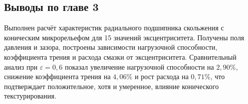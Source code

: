 \subsection*{Выводы по главе 3}
{}

Выполнен расчёт характеристик радиального подшипника скольжения с коническим микрорельефом для 15 значений эксцентриситета. Получены поля давления и зазора, построены зависимости нагрузочной способности, коэффициента трения и расхода смазки от эксцентриситета. Сравнительный анализ при $\varepsilon = 0{,}6$ показал увеличение нагрузочной способности на $2{,}90$\%, снижение коэффициента трения на $4{,}06$\% и рост расхода на $0{,}71$\%, что подтверждает положительное, хотя и умеренное, влияние конического текстурирования.
